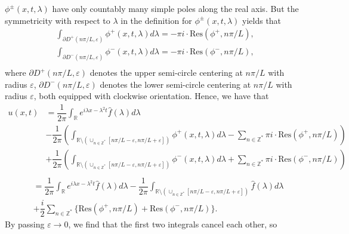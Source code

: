 \documentclass[12pt]{article}
\numberwithin{equation}{section}
\begin{document}
$\phi^{\pm}(x,t,\lambda)$ have only countably many simple poles along the real axis. But the symmetricity with respect to $\lambda$ in the definition for $\phi^{\pm}(x,t,\lambda)$ yields that 
\begin{equation}
    \begin{split}
    \int_{\partial D^+(n\pi/L,\varepsilon)}\phi^{+}(x,t,\lambda)d\lambda=-\pi i\cdot\text{Res}(\phi^{+},n\pi/L),\\
    \int_{\partial D^-(n\pi/L,\varepsilon)}\phi^{-}(x,t,\lambda)d\lambda=-\pi i\cdot\text{Res}(\phi^{-},n\pi/L),\\
    \end{split}
\end{equation}
where $\partial D^{+}(n\pi/L,\varepsilon)$ denotes the upper semi-circle centering at $n\pi/L$ with radius $\varepsilon$, $\partial D^{-}(n\pi/L,\varepsilon)$ denotes the lower semi-circle centering at $n\pi/L$ with radius $\varepsilon$, both equipped with clockwise orientation. Hence, we have that 
\begin{equation*}
    \begin{split}
        u(x,t)&=\dfrac{1}{2\pi}\int_{\mathbb{R}} e^{i\lambda x-\lambda^2t}\hat{f}(\lambda)d\lambda\\
        &-\dfrac{1}{2\pi}\left(\int_{\mathbb{R}\setminus(\cup_{n\in\mathbb{Z}^*}[n\pi/L-\varepsilon, n\pi/L+\varepsilon])}\phi^+(x,t,\lambda)d\lambda-\sum_{n\in\mathbb{Z}^*}\pi i\cdot \text{Res}(\phi^+,n\pi/L)\right)\\
        &+\dfrac{1}{2\pi}\left(\int_{\mathbb{R}\setminus(\cup_{n\in\mathbb{Z}^*}[n\pi/L-\varepsilon, n\pi/L+\varepsilon])}\phi^-(x,t,\lambda)d\lambda+\sum_{n\in\mathbb{Z}^*}\pi i\cdot \text{Res}(\phi^-,n\pi/L)\right)\\[1mm]
    \end{split}
\end{equation*}
\begin{equation*}
    \begin{split}
        &=\dfrac{1}{2\pi}\int_{\mathbb{R}} e^{i\lambda x-\lambda^2t}\hat{f}(\lambda)d\lambda-\dfrac{1}{2\pi}\int_{\mathbb{R}\setminus(\cup_{n\in\mathbb{Z}^*}[n\pi/L-\varepsilon, n\pi/L+\varepsilon])}\hat{f}(\lambda)d\lambda\\
        &+\dfrac{i}{2}\sum_{n\in\mathbb{Z}^*}\{\text{Res}(\phi^+,n\pi/L)+\text{Res}(\phi^-,n\pi/L)\}.
    \end{split}
\end{equation*}
By passing $\varepsilon\to 0$, we find that the first two integrals cancel each other, so 
\end{document}
